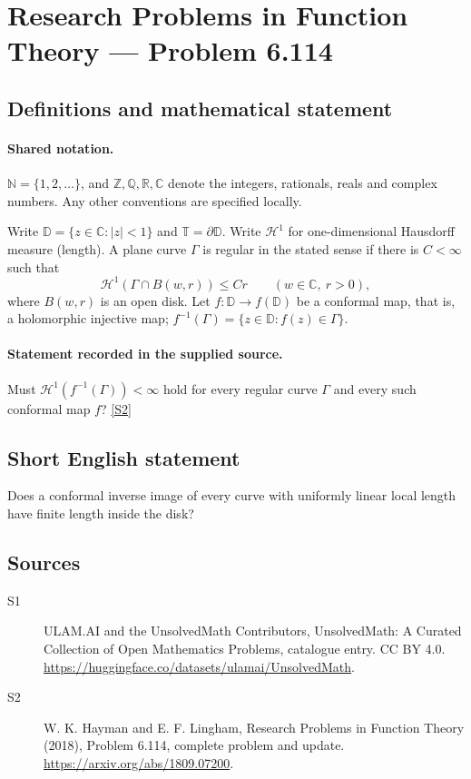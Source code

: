 \documentclass[11pt]{article}
\newcommand{\sref}[2]{\hyperlink{source:#1:#2}{[S#2]}}
\begin{document}
\section{Research Problems in Function Theory — Problem 6.114}\label{statement}

\subsection{Definitions and mathematical statement}

\paragraph{Shared notation.}$\mathbb N=\{1,2,\ldots\}$, and $\mathbb Z,\mathbb Q,\mathbb R,\mathbb C$ denote the integers, rationals, reals and complex numbers. Any other conventions are specified locally.


Write $\mathbb D=\{z\in\mathbb C:|z|<1\}$ and $\mathbb T=\partial\mathbb D$. Write $\mathcal H^1$ for one-dimensional Hausdorff measure (length). A plane curve $\Gamma$ is regular in the stated sense if there is $C<\infty$ such that
\[\mathcal H^1(\Gamma\cap B(w,r))\leq Cr\qquad(w\in\mathbb C,\ r>0),\]
where $B(w,r)$ is an open disk. Let $f:\mathbb D\to f(\mathbb D)$ be a conformal map, that is, a holomorphic injective map; $f^{-1}(\Gamma)=\{z\in\mathbb D:f(z)\in\Gamma\}$.
\paragraph{Statement recorded in the supplied source.}
Must $\mathcal H^1(f^{-1}(\Gamma))<\infty$ hold for every regular curve $\Gamma$ and every such conformal map $f$? \sref{statement}{2}
\subsection{Short English statement}
Does a conformal inverse image of every curve with uniformly linear local length have finite length inside the disk?
\subsection{Sources}
\begin{description}
\item[\hypertarget{source:statement:1}{S1}] ULAM.AI and the UnsolvedMath Contributors, UnsolvedMath: A Curated Collection of Open Mathematics Problems, catalogue entry. CC BY 4.0. \url{https://huggingface.co/datasets/ulamai/UnsolvedMath}.
\item[\hypertarget{source:statement:2}{S2}] W. K. Hayman and E. F. Lingham, Research Problems in Function Theory (2018), Problem 6.114, complete problem and update. \url{https://arxiv.org/abs/1809.07200}.
\end{description}
\label{end:statement}
\end{document}
